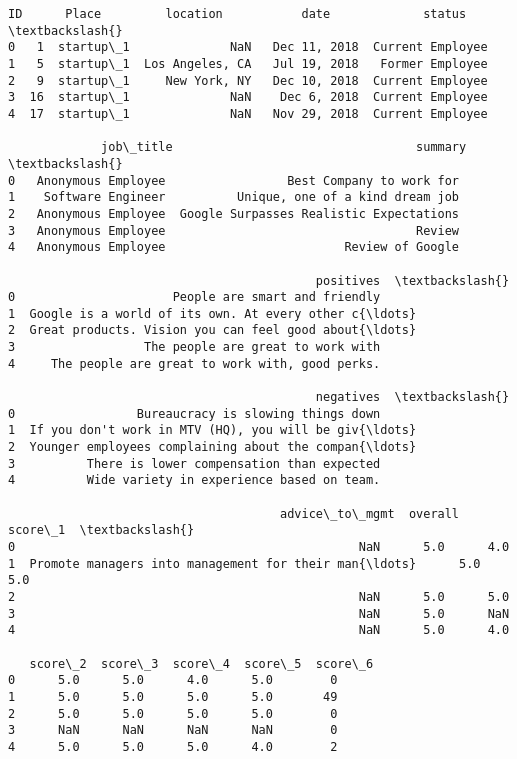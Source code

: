 \documentclass[11pt]{article}
\newcommand{\prompt}[4]{
        \llap{{\color{#2}[#3]: #4}}\vspace{-1.25em}
    }
\begin{document}
            \begin{tcolorbox}[breakable, boxrule=.5pt, size=fbox, pad at break*=1mm, opacityfill=0]
\prompt{Out}{outcolor}{2}{\hspace{3.5pt}}
\begin{Verbatim}[commandchars=\\\{\}]
   ID      Place         location           date             status  \textbackslash{}
0   1  startup\_1              NaN   Dec 11, 2018  Current Employee
1   5  startup\_1  Los Angeles, CA   Jul 19, 2018   Former Employee
2   9  startup\_1     New York, NY   Dec 10, 2018  Current Employee
3  16  startup\_1              NaN    Dec 6, 2018  Current Employee
4  17  startup\_1              NaN   Nov 29, 2018  Current Employee

             job\_title                                  summary  \textbackslash{}
0   Anonymous Employee                 Best Company to work for
1    Software Engineer          Unique, one of a kind dream job
2   Anonymous Employee  Google Surpasses Realistic Expectations
3   Anonymous Employee                                   Review
4   Anonymous Employee                         Review of Google

                                           positives  \textbackslash{}
0                      People are smart and friendly
1  Google is a world of its own. At every other c{\ldots}
2  Great products. Vision you can feel good about{\ldots}
3                  The people are great to work with
4     The people are great to work with, good perks.

                                           negatives  \textbackslash{}
0                 Bureaucracy is slowing things down
1  If you don't work in MTV (HQ), you will be giv{\ldots}
2  Younger employees complaining about the compan{\ldots}
3          There is lower compensation than expected
4          Wide variety in experience based on team.

                                      advice\_to\_mgmt  overall  score\_1  \textbackslash{}
0                                                NaN      5.0      4.0
1  Promote managers into management for their man{\ldots}      5.0      5.0
2                                                NaN      5.0      5.0
3                                                NaN      5.0      NaN
4                                                NaN      5.0      4.0

   score\_2  score\_3  score\_4  score\_5  score\_6
0      5.0      5.0      4.0      5.0        0
1      5.0      5.0      5.0      5.0       49
2      5.0      5.0      5.0      5.0        0
3      NaN      NaN      NaN      NaN        0
4      5.0      5.0      5.0      4.0        2
\end{Verbatim}
\end{tcolorbox}
        
\end{document}
